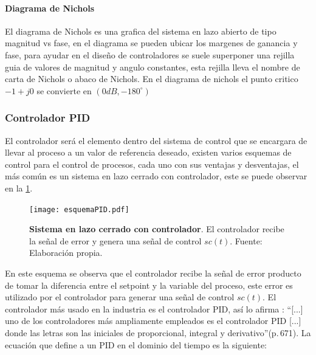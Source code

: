             \paragraph{Diagrama de Nichols}
                
                El diagrama de Nichols es una grafica del sistema en lazo abierto de tipo magnitud vs fase, en el diagrama se pueden ubicar los margenes de ganancia y fase, para ayudar en el diseño de controladores se suele superponer una rejilla guia de valores de magnitud y angulo constantes, esta rejilla lleva el nombre de carta de Nichols o abaco de Nichols. En el diagrama de nichols el punto critico $-1 + j0$ se convierte en $(0dB, -180^\circ)$

                \clearpage

        \subsubsection{Controlador PID}

            El controlador será el elemento dentro del sistema de control que se encargara de llevar al proceso a un valor de referencia deseado, existen varios esquemas de control para el control de procesos, cada uno con sus ventajas y desventajas, el más común es un sistema en lazo cerrado con controlador, este se puede observar en la \cref{fig:esquemaPID}.

            \begin{figure}[htb]
                \centering
                \texttt{[image: esquemaPID.pdf]}
                \caption[Ejemplo de un sistema en lazo cerrado con controlador]{\textbf{Sistema en lazo cerrado con controlador}. El controlador recibe la señal de error y genera una señal de control $sc(t)$. Fuente: Elaboración propia.} 
                \label{fig:esquemaPID}
            \end{figure}

            En este esquema se observa que el controlador recibe la señal de error producto de tomar la diferencia entre el setpoint y la variable del proceso, este error es utilizado por el controlador para generar una señal de control $sc(t)$. El controlador más usado en la industria es el controlador PID, así lo afirma \textcite{kuo1996sistemas}: \enquote{[...] uno de los controladores más ampliamente empleados es el controlador PID [...] donde las letras son las iniciales de proporcional, integral y derivativo}(p.$\,$671). La ecuación que define a un PID en el dominio del tiempo es la siguiente:

